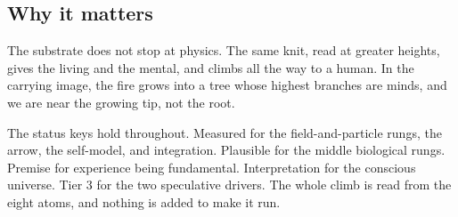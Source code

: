 \subsection{Why it matters}

The substrate does not stop at physics. The same knit, read at greater heights, gives the living and the mental, and climbs all the way to a human. In the carrying image, the fire grows into a tree whose highest branches are minds, and we are near the growing tip, not the root.

The status keys hold throughout. Measured for the field-and-particle rungs, the arrow, the self-model, and integration. Plausible for the middle biological rungs. Premise for experience being fundamental. Interpretation for the conscious universe. Tier 3 for the two speculative drivers. The whole climb is read from the eight atoms, and nothing is added to make it run.
